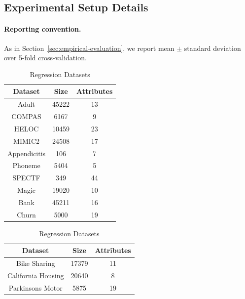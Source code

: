 \subsection{Experimental Setup Details}
\paragraph{Reporting convention.}
As in Section~\ref{sec:empirical-evaluation}, we report mean $\pm$ standard deviation over 5-fold cross-validation.

\label{app:datasets-model-details}
\begin{table}[htbp]
    \centering
    \small
    
    \begin{minipage}{0.48\textwidth}
        \centering
        \caption{Classification Datasets}
        \label{tab:clf-datasets}
        \begin{tabular}{ccc}
            \toprule
            \textbf{Dataset} & \textbf{Size} & \textbf{Attributes} \\
            \midrule
            Adult & 45222 & 13 \\
            COMPAS & 6167 & 9 \\
            HELOC & 10459 & 23 \\
            MIMIC2 & 24508 & 17 \\
            Appendicitis & 106 & 7 \\
            Phoneme & 5404 & 5 \\
            SPECTF & 349 & 44 \\
            Magic & 19020 & 10 \\
            Bank & 45211 & 16 \\
            Churn & 5000 & 19 \\
            \bottomrule
        \end{tabular}
    \end{minipage}
    \hfill %
    \begin{minipage}{0.48\textwidth}
        \centering
        \caption{Regression Datasets}
        \label{tab:regr-datasets}
        \begin{tabular}{ccc}
            \toprule
            \textbf{Dataset} & \textbf{Size} & \textbf{Attributes} \\
            \midrule
            Bike Sharing & 17379 & 11 \\
            California Housing & 20640 & 8 \\
            Parkinsons Motor & 5875 & 19 \\

\end{tabular}
\end{minipage}
\end{table}
